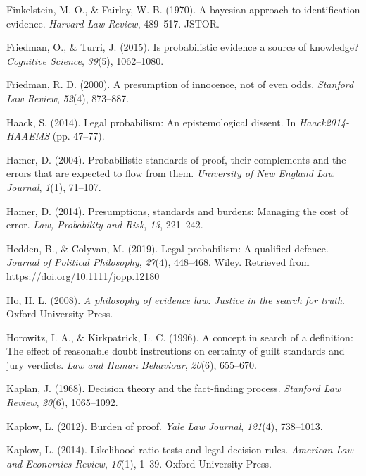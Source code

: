 \documentclass[10pt,dvipsnames,enabledeprecatedfontcommands]{scrartcl}
\begin{document}
\leavevmode\hypertarget{ref-finkelstein1970bayesian}{}%
Finkelstein, M. O., \& Fairley, W. B. (1970). A bayesian approach to
identification evidence. \emph{Harvard Law Review}, 489--517. JSTOR.

\leavevmode\hypertarget{ref-friedman2015}{}%
Friedman, O., \& Turri, J. (2015). Is probabilistic evidence a source of
knowledge? \emph{Cognitive Science}, \emph{39}(5), 1062--1080.

\leavevmode\hypertarget{ref-Friedman2000presumption}{}%
Friedman, R. D. (2000). A presumption of innocence, not of even odds.
\emph{Stanford Law Review}, \emph{52}(4), 873--887.

\leavevmode\hypertarget{ref-haack2011legal}{}%
Haack, S. (2014). Legal probabilism: An epistemological dissent. In
\emph{Haack2014-HAAEMS} (pp. 47--77).

\leavevmode\hypertarget{ref-hamer2004}{}%
Hamer, D. (2004). Probabilistic standards of proof, their complements
and the errors that are expected to flow from them. \emph{University of
New England Law Journal}, \emph{1}(1), 71--107.

\leavevmode\hypertarget{ref-hamer2014}{}%
Hamer, D. (2014). Presumptions, standards and burdens: Managing the cost
of error. \emph{Law, Probability and Risk}, \emph{13}, 221--242.

\leavevmode\hypertarget{ref-HeddenColyvan2019legal}{}%
Hedden, B., \& Colyvan, M. (2019). Legal probabilism: A qualified
defence. \emph{Journal of Political Philosophy}, \emph{27}(4), 448--468.
Wiley. Retrieved from \url{https://doi.org/10.1111/jopp.12180}

\leavevmode\hypertarget{ref-ho2008philosophy}{}%
Ho, H. L. (2008). \emph{A philosophy of evidence law: Justice in the
search for truth}. Oxford University Press.

\leavevmode\hypertarget{ref-Horowitz1996}{}%
Horowitz, I. A., \& Kirkpatrick, L. C. (1996). A concept in search of a
definition: The effect of reasonable doubt instrcutions on certainty of
guilt standards and jury verdicts. \emph{Law and Human Behaviour},
\emph{20}(6), 655--670.

\leavevmode\hypertarget{ref-Kaplan1968decision}{}%
Kaplan, J. (1968). Decision theory and the fact-finding process.
\emph{Stanford Law Review}, \emph{20}(6), 1065--1092.

\leavevmode\hypertarget{ref-kaplow2012}{}%
Kaplow, L. (2012). Burden of proof. \emph{Yale Law Journal},
\emph{121}(4), 738--1013.

\leavevmode\hypertarget{ref-kaplow2014likelihood}{}%
Kaplow, L. (2014). Likelihood ratio tests and legal decision rules.
\emph{American Law and Economics Review}, \emph{16}(1), 1--39. Oxford
University Press.
\end{document}
